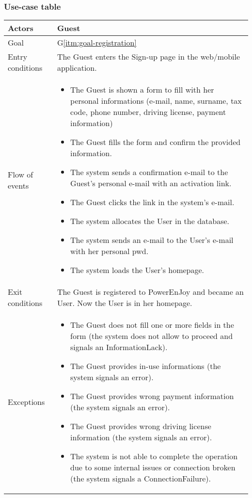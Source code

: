 \subsubsection{Use-case table}
\begin{center}
  \begin{tabular}{ l | p{10cm} }
    \hline
    Actors & Guest\\ \hline
    Goal & G\ref{itm:goal-registration}\\ \hline
    Entry conditions & The Guest enters the Sign-up page in the web/mobile application. 
     \\ \hline
    Flow of events &
    \begin{itemize} %
      \item The Guest is shown a form to fill with her personal informations (e-mail, name, surname, tax code, phone number, driving license, payment information) %
      \item The Guest fills the form and confirm the provided information.
      \item The system sends a confirmation e-mail to the Guest's personal e-mail with an activation link.
      \item The Guest clicks the link in the system's e-mail.
      \item The system allocates the User in the database.
      \item The system sends an e-mail to the User's e-mail with her personal \gls{pwd}.
      \item The system loads the User's homepage.
    \end{itemize} \\ \hline
    Exit conditions & The Guest is registered to PowerEnJoy and became an User. Now the User is in her homepage. \\ \hline
  	Exceptions & 
    \begin{itemize}
      \item The Guest does not fill one or more fields in the form (the system does not allow to proceed and signals an InformationLack).
      \item The Guest provides in-use informations (the system signals an error).
      \item The Guest provides wrong payment information (the system signals an error).
      \item The Guest provides wrong driving license information (the system signals an error).
      \item The system is not able to complete the operation due to some internal issues or connection broken (the system signals a ConnectionFailure). %
    \end{itemize} \\ \hline
  \end{tabular}
\end{center}


